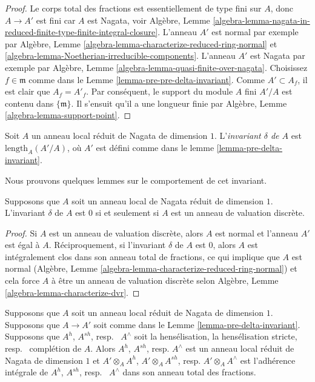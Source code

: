 \begin{proof}
Le corps total des fractions est essentiellement de type fini
sur $A$, donc $A \to A'$ est fini car $A$ est Nagata, voir
Algèbre, Lemme
\ref{algebra-lemma-nagata-in-reduced-finite-type-finite-integral-closure}.
L'anneau $A'$ est normal par exemple par Algèbre, Lemme
\ref{algebra-lemma-characterize-reduced-ring-normal} et
\ref{algebra-lemma-Noetherian-irreducible-components}. L'anneau $A'$
est Nagata par exemple par Algèbre, Lemme
\ref{algebra-lemma-quasi-finite-over-nagata}. Choisissez $f \in \mathfrak
m$ comme dans le Lemme \ref{lemma-pre-pre-delta-invariant}. Comme $A'
\subset A_f$, il est clair que $A_f = A'_f$. Par conséquent, le support du
module $A$ fini $A'/A$ est contenu dans $\{\mathfrak m\}$. Il s'ensuit qu'il
a une longueur finie par Algèbre, Lemme \ref{algebra-lemma-support-point}.
\end{proof}

\begin{definition}
\label{definition-delta-invariant-algebra}
Soit $A$ un anneau local réduit de Nagata de dimension $1$.
L'{\it invariant $\delta$ de $A$ } est $\text{length}_A(A'/A)$, où
$A'$ est défini comme dans le lemme \ref{lemma-pre-delta-invariant}.
\end{definition}

\noindent
Nous prouvons quelques lemmes sur le comportement de cet invariant.

\begin{lemma}
\label{lemma-delta-invariant-is-zero}
Supposons que $A$ soit un anneau local de Nagata réduit
de dimension $1$. L'invariant $\delta$ de $A$ est $0$ si
et seulement si $A$ est un anneau de valuation discrète.
\end{lemma}

\begin{proof}
Si $A$ est un anneau de valuation discrète, alors $A$
est normal et l'anneau $A'$ est égal à $A$.
Réciproquement, si l'invariant $\delta$ de $A$ est $0$,
alors $A$ est intégralement clos dans son anneau total de
fractions, ce qui implique que $A$ est normal (Algèbre,
Lemme
\ref{algebra-lemma-characterize-reduced-ring-normal}) et cela force $A$ à être un
anneau de valuation discrète selon Algèbre, Lemme \ref{algebra-lemma-characterize-dvr}.
\end{proof}

\begin{lemma}
\label{lemma-normalization-same-after-completion}
Supposons que $A$ soit un anneau local réduit de Nagata de
dimension $1$. Supposons que $A \to A'$ soit comme dans le
Lemme \ref{lemma-pre-delta-invariant}. Supposons que $A^h$,
$A^{sh}$, resp. \ $A^\wedge$ soit la hensélisation, la
hensélisation stricte, resp. \ complétion de $A$. Alors $A^h$,
$A^{sh}$, resp. $A^\wedge$ est un anneau local réduit de Nagata
de dimension $1$ et $A' \otimes_A A^h$, $A' \otimes_A A^{sh}$,
resp. $A' \otimes_A A^\wedge$ est l'adhérence intégrale de $A^h$,
$A^{sh}$, resp. \ $A^\wedge$ dans son anneau total des fractions.
\end{lemma}

